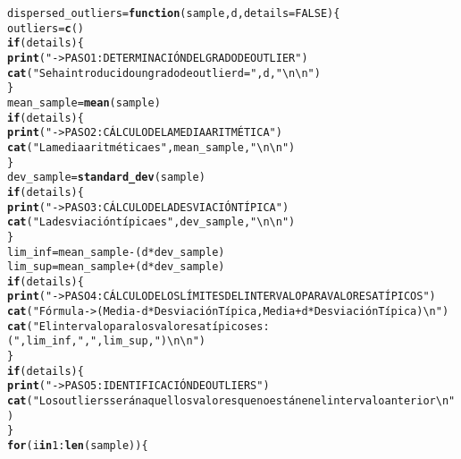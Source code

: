 \documentclass[12pt]{report}\usepackage[]{graphicx}\usepackage[dvipsnames]{xcolor}
\makeatletter
\newcommand{\hlnum}[1]{\textcolor[rgb]{0.686,0.059,0.569}{#1}}%
\newcommand{\hlstr}[1]{\textcolor[rgb]{0.192,0.494,0.8}{#1}}%
\newcommand{\hlopt}[1]{\textcolor[rgb]{0,0,0}{#1}}%
\newcommand{\hlstd}[1]{\textcolor[rgb]{0.345,0.345,0.345}{#1}}%
\newcommand{\hlkwa}[1]{\textcolor[rgb]{0.161,0.373,0.58}{\textbf{#1}}}%
\newcommand{\hlkwb}[1]{\textcolor[rgb]{0.69,0.353,0.396}{#1}}%
\newcommand{\hlkwc}[1]{\textcolor[rgb]{0.333,0.667,0.333}{#1}}%
\newcommand{\hlkwd}[1]{\textcolor[rgb]{0.737,0.353,0.396}{\textbf{#1}}}%
\newenvironment{kframe}{%
 \def\at@end@of@kframe{}%
 \ifinner\ifhmode%
  \def\at@end@of@kframe{\end{minipage}}%
  \begin{minipage}{\columnwidth}%
 \fi\fi%
 \def\FrameCommand##1{\hskip\@totalleftmargin \hskip-\fboxsep
 \colorbox{shadecolor}{##1}\hskip-\fboxsep
     \hskip-\linewidth \hskip-\@totalleftmargin \hskip\columnwidth}%
 \MakeFramed {\advance\hsize-\width
   \@totalleftmargin\z@ \linewidth\hsize
   \@setminipage}}%
 {\par\unskip\endMakeFramed%
 \at@end@of@kframe}
\newenvironment{knitrout}{}{} %
\makeatother
\begin{document}
\begin{knitrout}
\color{fgcolor}\begin{kframe}
\begin{alltt}
\hlstd{dispersed_outliers} \hlkwb{=} \hlkwa{function}\hlstd{(}\hlkwc{sample}\hlstd{,} \hlkwc{d}\hlstd{,} \hlkwc{details} \hlstd{=} \hlnum{FALSE}\hlstd{)\{}
        \hlstd{outliers} \hlkwb{=} \hlkwd{c}\hlstd{()}
        \hlkwa{if}\hlstd{(details)\{}
                \hlkwd{print}\hlstd{(}\hlstr{"->PASO 1: DETERMINACIÓN DEL GRADO DE OUTLIER"}\hlstd{)}
                \hlkwd{cat}\hlstd{(}\hlstr{"Se ha introducido un grado de outlier d = "}\hlstd{,d,}\hlstr{"\textbackslash{}n\textbackslash{}n"}\hlstd{)}
        \hlstd{\}}
        \hlstd{mean_sample} \hlkwb{=} \hlkwd{mean}\hlstd{(sample)}
        \hlkwa{if} \hlstd{(details)\{}
                \hlkwd{print}\hlstd{(}\hlstr{"->PASO 2: CÁLCULO DE LA MEDIA ARITMÉTICA"}\hlstd{)}
                \hlkwd{cat}\hlstd{(}\hlstr{"La media aritmética es "}\hlstd{, mean_sample,} \hlstr{"\textbackslash{}n\textbackslash{}n"}\hlstd{)}
        \hlstd{\}}
        \hlstd{dev_sample} \hlkwb{=} \hlkwd{standard_dev}\hlstd{(sample)}
        \hlkwa{if} \hlstd{(details)\{}
                \hlkwd{print}\hlstd{(}\hlstr{"->PASO 3: CÁLCULO DE LA DESVIACIÓN TÍPICA"}\hlstd{)}
                \hlkwd{cat}\hlstd{(}\hlstr{"La desviación típica es "}\hlstd{, dev_sample,} \hlstr{"\textbackslash{}n\textbackslash{}n"}\hlstd{)}
        \hlstd{\}}
        \hlstd{lim_inf} \hlkwb{=} \hlstd{mean_sample} \hlopt{-} \hlstd{(d}\hlopt{*}\hlstd{dev_sample)}
        \hlstd{lim_sup} \hlkwb{=} \hlstd{mean_sample} \hlopt{+} \hlstd{(d}\hlopt{*}\hlstd{dev_sample)}
        \hlkwa{if} \hlstd{(details)\{}
                \hlkwd{print}\hlstd{(}\hlstr{"->PASO 4: CÁLCULO DE LOS LÍMITES DEL INTERVALO PARA VALORES ATÍPICOS"}\hlstd{)}
                \hlkwd{cat}\hlstd{(}\hlstr{"Fórmula -> (Media - d*DesviaciónTípica, Media + d*DesviaciónTípica)\textbackslash{}n"}\hlstd{)}
                \hlkwd{cat}\hlstd{(}\hlstr{"El intervalo para los valores atípicos es: ("}\hlstd{,lim_inf,}\hlstr{", "}\hlstd{,lim_sup,}\hlstr{")\textbackslash{}n\textbackslash{}n"}\hlstd{)}
        \hlstd{\}}
        \hlkwa{if}\hlstd{(details)\{}
                \hlkwd{print}\hlstd{(}\hlstr{"->PASO 5: IDENTIFICACIÓN DE OUTLIERS"}\hlstd{)}
                \hlkwd{cat}\hlstd{(}\hlstr{"Los outliers serán aquellos valores que no están en el intervalo anterior\textbackslash{}n"}\hlstd{)}
        \hlstd{\}}
        \hlkwa{for} \hlstd{(i} \hlkwa{in} \hlnum{1}\hlopt{:}\hlkwd{len}\hlstd{(sample))\{}

\end{alltt}
\end{kframe}
\end{knitrout}
\end{document}
